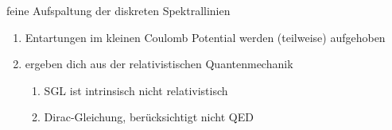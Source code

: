 feine Aufspaltung der diskreten Spektrallinien
\begin{enumerate}[$ \Rightarrow $]
	\item Entartungen im kleinen Coulomb Potential werden (teilweise) aufgehoben
	\item ergeben dich aus der relativistischen Quantenmechanik
	\begin{enumerate}[$ \rightarrow $]
		\item SGL ist intrinsisch nicht relativistisch
		\item Dirac-Gleichung, berücksichtigt nicht QED
	\end{enumerate}
\end{enumerate}
